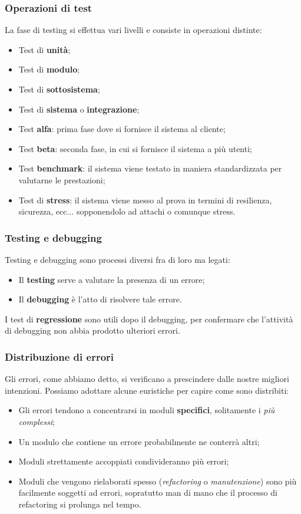 \documentclass[a4paper,11pt]{article}
\begin{document}
\subsubsection{Operazioni di test}
La fase di testing si effettua vari livelli e consiste in operazioni distinte:
\begin{itemize}
	\item Test di \textbf{unità};
	\item Test di \textbf{modulo};
	\item Test di \textbf{sottosistema};
	\item Test di \textbf{sistema} o \textbf{integrazione};
	\item Test \textbf{alfa}: prima fase dove si fornisce il sistema al cliente;
	\item Test \textbf{beta}: seconda fase, in cui si fornisce il sistema a più utenti;
	\item Test \textbf{benchmark}: il sistema viene testato in maniera standardizzata per valutarne le prestazioni;
	\item Test di \textbf{stress}: il sistema viene messo al prova in termini di resilienza, sicurezza, ecc... sopponendolo ad attachi o comunque stress.
\end{itemize}

\subsubsection{Testing e debugging}
Testing e debugging sono processi diversi fra di loro ma legati:
\begin{itemize}
	\item Il \textbf{testing} serve a valutare la presenza di un errore;
	\item Il \textbf{debugging} è l'atto di risolvere tale errore.
\end{itemize}

I test di \textbf{regressione} sono utili dopo il debugging, per confermare che l'attività di debugging non abbia prodotto ulteriori errori.

\subsubsection{Distribuzione di errori}
Gli errori, come abbiamo detto, si verificano a prescindere dalle nostre migliori intenzioni.
Possiamo adottare alcune euristiche per capire come sono distribiti:
\begin{itemize}
	\item Gli errori tendono a concentrarsi in moduli \textbf{specifici}, solitamente i \textit{più complessi};
	\item Un modulo che contiene un errore probabilmente ne conterrà altri;
	\item Moduli strettamente accoppiati condivideranno più errori;
	\item Moduli che vengono rielaborati spesso (\textit{refactoring} o \textit{manutenzione}) sono più facilmente soggetti ad errori, sopratutto man di mano che il processo di refactoring si prolunga nel tempo.
\end{itemize}
\end{document}
